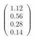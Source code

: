 \documentclass[preview]{standalone}
\begin{document}
\begin{align*}
\begin{pmatrix} 1.12 \\ 0.56 \\ 0.28 \\ 0.14 \end{pmatrix}
\end{align*}
\end{document}
